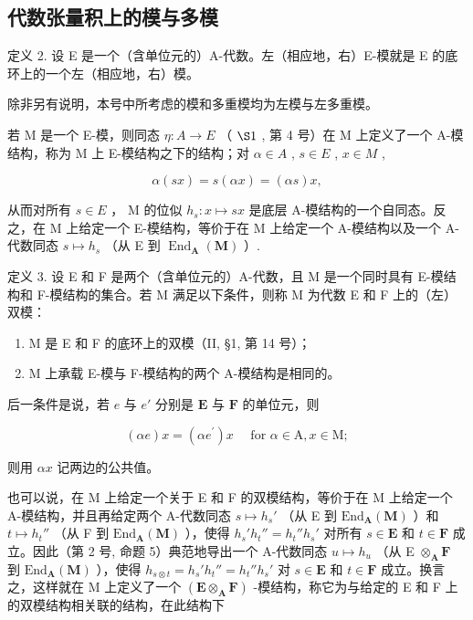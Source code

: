\subsection{代数张量积上的模与多模}

定义 2. 设 E 是一个（含单位元的）A-代数。左（相应地，右）E-模就是 E 的底环上的一个左（相应地，右）模。

除非另有说明，本号中所考虑的模和多重模均为左模与左多重模。

若 M 是一个 E-模，则同态 \(\eta: A \to E\) （ \(\S 1\) , 第 4 号）在 M 上定义了一个 A-模结构，称为 M 上 E-模结构之下的结构；对 \(\alpha \in A\) , \(s \in E\) , \(x \in M\) ,

\[
\alpha (s x) = s (\alpha x) = (\alpha s) x,\tag{7}
\]

从而对所有 \(s \in E\) ， M 的位似 \(h_{s}: x \mapsto sx\) 是底层 A-模结构的一个自同态。反之，在 M 上给定一个 E-模结构，等价于在 M 上给定一个 A-模结构以及一个 A-代数同态 \(s \mapsto h_{s}\) （从 E 到 \(\operatorname{End}_{\mathbf{A}}(\mathbf{M})\) ）.

定义 3. 设 E 和 F 是两个（含单位元的）A-代数，且 M 是一个同时具有 E-模结构和 F-模结构的集合。若 M 满足以下条件，则称 M 为代数 E 和 F 上的（左）双模：

\begin{enumerate}
\def\labelenumi{(\arabic{enumi})}
\item
  M 是 E 和 F 的底环上的双模（II, §1, 第 14 号）；
\item
  M 上承载 E-模与 F-模结构的两个 A-模结构是相同的。
\end{enumerate}

后一条件是说，若 \(e\) 与 \(e'\) 分别是 \(\mathbf{E}\) 与 \(\mathbf{F}\) 的单位元，则

\[
(\alpha e) x = (\alpha e ^ {\prime}) x \quad \text { for } \alpha \in \mathrm{A}, x \in \mathrm{M};\tag{8}
\]

则用 \(\alpha x\) 记两边的公共值。

也可以说，在 M 上给定一个关于 E 和 F 的双模结构，等价于在 M 上给定一个 A-模结构，并且再给定两个 A-代数同态 \(s \mapsto h_s'\) （从 E 到 \(\mathrm{End}_{\mathbf{A}}(\mathbf{M})\) ）和 \(t \mapsto h_t''\) （从 F 到 \(\mathrm{End}_{\mathbf{A}}(\mathbf{M})\) ），使得 \(h_s'h_t'' = h_t''h_s'\) 对所有 \(s \in \mathbf{E}\) 和 \(t \in \mathbf{F}\) 成立。因此（第 2 号, 命题 5）典范地导出一个 A-代数同态 \(u \mapsto h_u\) （从 E \(\otimes_{\mathbf{A}} \mathbf{F}\) 到 \(\mathrm{End}_{\mathbf{A}}(\mathbf{M})\) ），使得 \(h_{s \otimes t} = h_s'h_t'' = h_t''h_s'\) 对 \(s \in \mathbf{E}\) 和 \(t \in \mathbf{F}\) 成立。换言之，这样就在 M 上定义了一个 \((\mathbf{E} \otimes_{\mathbf{A}} \mathbf{F})\) -模结构，称它为与给定的 E 和 F 上的双模结构相关联的结构，在此结构下

